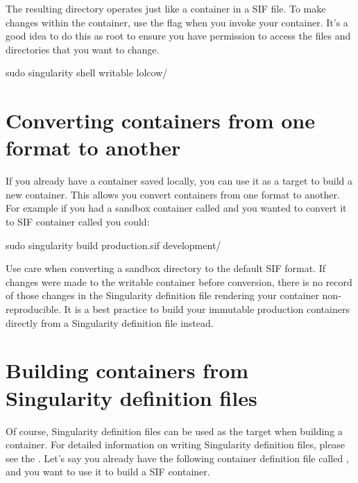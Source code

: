 \documentclass[letterpaper,10pt,english]{sphinxmanual}
\begin{document}
The resulting directory operates just like a container in a SIF file. To make
changes within the container, use the  flag when you invoke your
container.  It’s a good idea to do this as root to ensure you have permission to
access the files and directories that you want to change.

%
\begin{sphinxVerbatim}[commandchars=\\\{\}]
\PYGZdl{} sudo singularity shell \PYGZhy{}\PYGZhy{}writable lolcow/
\end{sphinxVerbatim}


\section{Converting containers from one format to another}
\label{\detokenize{build_a_container:converting-containers-from-one-format-to-another}}
If you already have a container saved locally, you can use it as a target to
build a new container. This allows you convert containers from one format to
another. For example if you had a sandbox container called  and
you wanted to convert it to SIF container called  you could:

%
\begin{sphinxVerbatim}[commandchars=\\\{\}]
\PYGZdl{} sudo singularity build production.sif development/
\end{sphinxVerbatim}

Use care when converting a sandbox directory to the default SIF format. If
changes were made to the writable container before conversion, there is no
record of those changes in the Singularity definition file rendering your
container non-reproducible. It is a best practice to build your immutable
production containers directly from a Singularity definition file instead.


\section{Building containers from Singularity definition files}
\label{\detokenize{build_a_container:building-containers-from-singularity-definition-files}}
Of course, Singularity definition files can be used as the target when building
a container. For detailed information on writing Singularity definition files,
please see the . Let’s say
you already have the following container definition file called ,
and you want to use it to build a SIF container.
\end{document}
